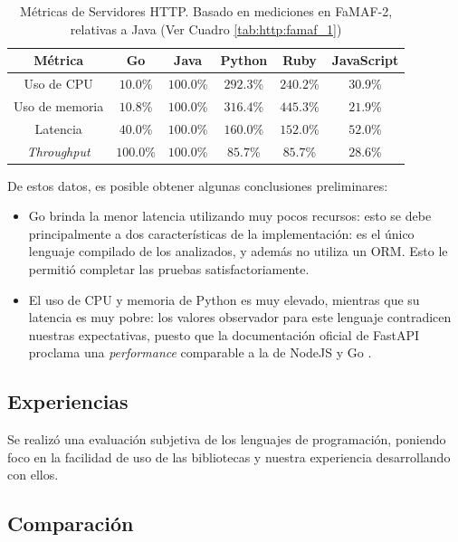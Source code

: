 \documentclass[11pt]{article}
\let\Oldsubsection\subsection
\renewcommand{\subsection}{\FloatBarrier\Oldsubsection}
\newcommand{\english}[1]{\textit{#1}}
\begin{document}
\begin{table}[h]
\centering
\begin{tabular}{|c|c|c|c|c|c|}
\hline
Métrica & Go       & Java     & Python   & Ruby     & JavaScript \\ \hline
Uso de CPU   & $10.0$\%  & $100.0$\% & $292.3$\% & $240.2$\% & $30.9$\%    \\ \hline
Uso de memoria  & $10.8$\%  & $100.0$\% & $316.4$\% & $445.3$\% & $21.9$\%    \\ \hline
Latencia     & $40.0$\%  & $100.0$\% & $160.0$\% & $152.0$\% & $52.0$\%    \\ \hline
\textit{Throughput} & $100.0$\% & $100.0$\% & $85.7$\%  & $85.7$\%  & $28.6$\%    \\ \hline
\end{tabular}
\caption{Métricas de Servidores HTTP. Basado en mediciones en FaMAF-2, relativas a Java (Ver Cuadro \ref{tab:http:famaf_1})}
\label{tab:http:metrics}
\end{table}

De estos datos, es posible obtener algunas conclusiones preliminares:

\begin{itemize}
    \item Go brinda la menor latencia utilizando muy pocos recursos: esto se debe principalmente a dos características de la implementación: es el único lenguaje compilado de los analizados, y además no utiliza un ORM. Esto le permitió completar las pruebas satisfactoriamente.
    \item El uso de CPU y memoria de Python es muy elevado, mientras que su latencia es muy pobre: los valores observador para este lenguaje contradicen nuestras expectativas, puesto que la documentación oficial de FastAPI proclama una \english{performance} comparable a la de NodeJS y Go \cite{http:fastapi_performance}.
\end{itemize}

\subsection{Experiencias}

Se realizó una evaluación subjetiva de los lenguajes de programación, poniendo foco en la facilidad de uso de las bibliotecas y nuestra experiencia desarrollando con ellos.

\subsection{Comparación}
\end{document}
